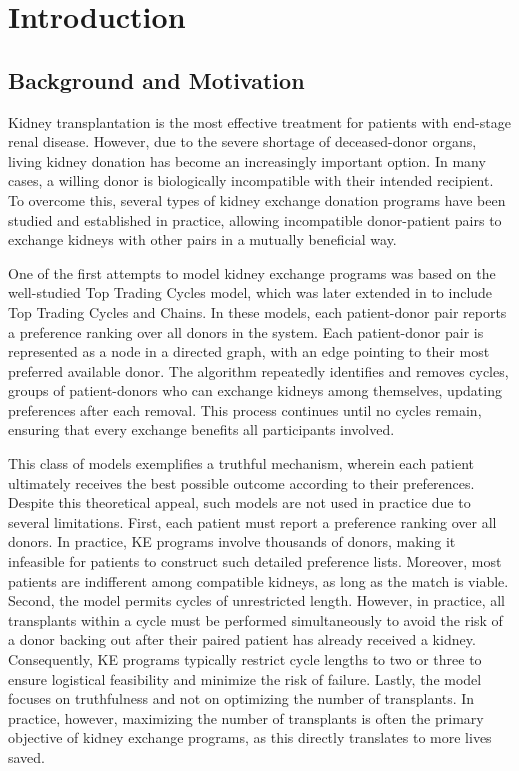 \chapter{Introduction}
\label{cha:introduction}


\section{Background and Motivation}
\label{sec:background_and_motivation}

Kidney transplantation is the most effective treatment for patients with end-stage renal disease. However, due to the severe shortage of deceased-donor organs, living kidney donation has become an increasingly important option. In many cases, a willing donor is biologically incompatible with their intended recipient. To overcome this, several types of kidney exchange donation programs have been studied and established in practice, allowing incompatible donor-patient pairs to exchange kidneys with other pairs in a mutually beneficial way.

One of the first attempts to model kidney exchange programs was based on the well-studied Top Trading Cycles model, which was later extended in \cite{roth2004kidney} to include Top Trading Cycles and Chains. In these models, each patient-donor pair reports a preference ranking over all donors in the system. Each patient-donor pair is represented as a node in a directed graph, with an edge pointing to their most preferred available donor. The algorithm repeatedly identifies and removes cycles, groups of patient-donors who can exchange kidneys among themselves, updating preferences after each removal. This process continues until no cycles remain, ensuring that every exchange benefits all participants involved.

This class of models exemplifies a truthful mechanism, wherein each patient ultimately receives the best possible outcome according to their preferences. Despite this theoretical appeal, such models are not used in practice due to several limitations. First, each patient must report a preference ranking over all donors. In practice, \ac{KE} programs involve thousands of donors, making it infeasible for patients to construct such detailed preference lists. Moreover, most patients are indifferent among compatible kidneys, as long as the match is viable. Second, the model permits cycles of unrestricted length. However, in practice, all transplants within a cycle must be performed simultaneously to avoid the risk of a donor backing out after their paired patient has already received a kidney. Consequently, \ac{KE} programs typically restrict cycle lengths to two or three to ensure logistical feasibility and minimize the risk of failure. Lastly, the model focuses on truthfulness and not on optimizing the number of transplants. In practice, however, maximizing the number of transplants is often the primary objective of kidney exchange programs, as this directly translates to more lives saved.


